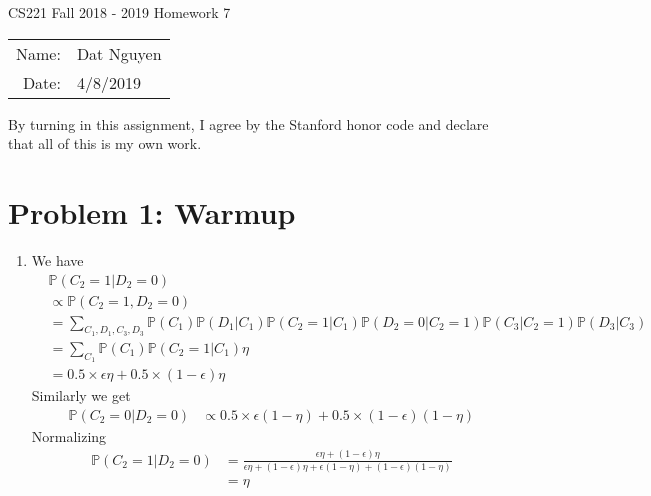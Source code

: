 \documentclass[12pt]{article}
\begin{document}
\begin{center}
{\Large CS221 Fall 2018 - 2019 Homework 7}

\begin{tabular}{rl}     
Name: & Dat Nguyen \\
Date: & 4/8/2019
\end{tabular}
\end{center}
 
 By turning in this assignment, I agree by the Stanford honor code and declare that all of this is my own work.

\section*{Problem 1: Warmup}
\begin{enumerate}[label=(\alph*)]
	\item We have
	\begin{align*}
		&\mathbb{P}(C_2 = 1 | D_2 = 0) \\
		&\propto \mathbb{P}(C_2 = 1, D_2 = 0) \\
		&=\sum_{C_1, D_1, C_3, D_3} \mathbb{P}(C_1) \mathbb{P}(D_1|C_1) \mathbb{P}(C_2 = 1|C_1) \mathbb{P}(D_2 = 0|C_2 = 1) \mathbb{P}(C_3|C_2 = 1) \mathbb{P}(D_3|C_3) \\
		&=\sum_{C_1}\mathbb{P}(C_1) \mathbb{P}(C_2 = 1|C_1) \eta \\
		&= 0.5 \times \epsilon \eta + 0.5 \times (1 - \epsilon) \eta 
	\end{align*}
	Similarly we get
	\begin{align*}
		\mathbb{P}(C_2 = 0 | D_2 = 0) &\propto 0.5 \times \epsilon (1 - \eta) + 0.5 \times (1 - \epsilon) (1 - \eta)
	\end{align*}
	Normalizing
	\begin{align*}
		\mathbb{P}(C_2 = 1 | D_2 = 0) &= \frac{\epsilon\eta + (1 - \epsilon)\eta}{\epsilon\eta + (1 - \epsilon)\eta + \epsilon(1 - \eta) + (1 - \epsilon)(1 - \eta)} \\
		&= \eta
	\end{align*}


\end{enumerate}
\end{document}
